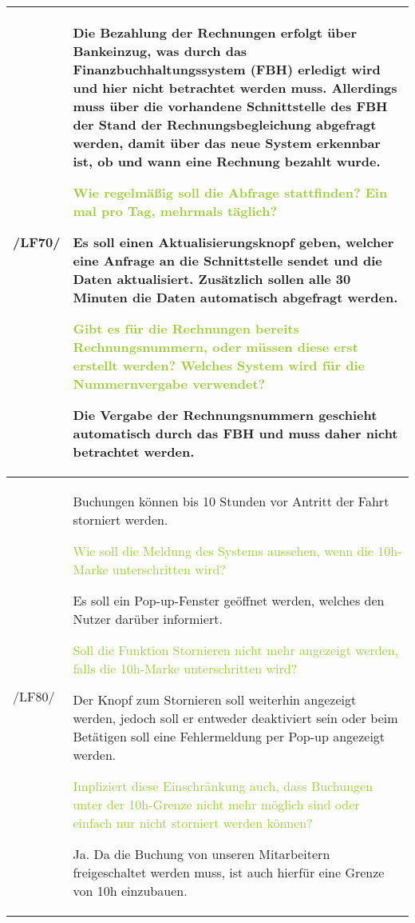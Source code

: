\begin{tabular}[ht] {l | p{13cm}}
    \hline
    /LF70/ & Die Bezahlung der Rechnungen erfolgt über Bankeinzug, was durch das Finanzbuchhaltungssystem (FBH) erledigt wird und hier nicht betrachtet werden muss. Allerdings muss über die vorhandene Schnittstelle des FBH der Stand der Rechnungsbegleichung abgefragt werden, damit über das neue System erkennbar ist, ob und wann eine Rechnung bezahlt wurde. 
    


    \textcolor{YellowGreen}{Wie regelmäßig soll die Abfrage stattfinden? Ein mal pro Tag, mehrmals täglich?}

    \textcolor{NavyBlue}{Es soll einen Aktualisierungsknopf geben, welcher eine Anfrage an die Schnittstelle sendet und die Daten aktualisiert. Zusätzlich sollen alle 30 Minuten die Daten automatisch abgefragt werden.}

    \textcolor{YellowGreen}{Gibt es für die Rechnungen bereits Rechnungsnummern, oder müssen diese erst erstellt werden? Welches System wird für die Nummernvergabe verwendet?}
    
    \textcolor{NavyBlue}{Die Vergabe der Rechnungsnummern geschieht automatisch durch das FBH und muss daher nicht betrachtet werden.}
    \\
    \hline
    /LF80/ & Buchungen können bis 10 Stunden vor Antritt der Fahrt storniert werden.
    
    \textcolor{YellowGreen}{Wie soll die Meldung des Systems aussehen, wenn die 10h-Marke unterschritten wird?}

    \textcolor{NavyBlue}{Es soll ein Pop-up-Fenster geöffnet werden, welches den Nutzer darüber informiert.}

    \textcolor{YellowGreen}{Soll die Funktion \grqq{}Stornieren\grqq{} nicht mehr angezeigt werden, falls die 10h-Marke unterschritten wird?}

    \textcolor{NavyBlue}{Der Knopf zum Stornieren soll weiterhin angezeigt werden, jedoch soll er entweder deaktiviert sein oder beim Betätigen soll eine Fehlermeldung per Pop-up angezeigt werden.}

    \textcolor{YellowGreen}{Impliziert diese Einschränkung auch, dass Buchungen unter der 10h-Grenze nicht mehr möglich sind oder einfach nur nicht storniert werden können?}

    \textcolor{NavyBlue}{Ja. Da die Buchung von unseren Mitarbeitern freigeschaltet werden muss, ist auch hierfür eine Grenze von 10h einzubauen.}
    \\
    \hline
\end{tabular}

